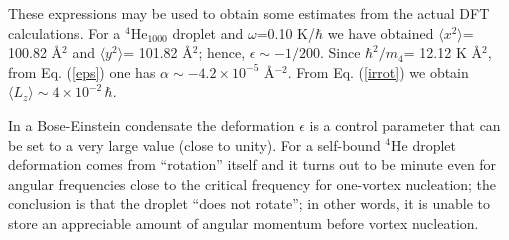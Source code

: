  These expressions may be used to obtain some estimates from the actual DFT calculations.
 For  a $^4$He$_{1000}$ droplet and $\omega$=0.10 K/$\hbar$ 
 we have obtained $\langle x^2\rangle$= 100.82 \AA$^2$ and  $\langle y^2\rangle$= 101.82 \AA$^2$; hence,
 $\epsilon \sim -1/200$. Since $\hbar^2/m_4$= 12.12 K \AA$^2$, from Eq. (\ref{eps}) one has $\alpha \sim -4.2 \times 10^{-5}$ \AA$^{-2}$. 
From Eq. (\ref{irrot}) we obtain  $\langle L_z\rangle \sim 4 \times 10^{-2} \, \hbar$.
  
 In a Bose-Einstein condensate  the deformation $\epsilon$ is a control parameter that can be set to a very large value (close to unity). For a self-bound $^4$He droplet deformation comes from
 ``rotation'' itself and it turns out to be minute
  even for angular frequencies close to the critical frequency  for one-vortex nucleation; the conclusion is that the droplet ``does not rotate'';
 in other words, it is unable to store an appreciable amount of angular momentum before vortex  nucleation.
